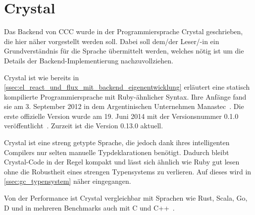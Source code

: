 \section{Crystal}
\label{sec:g_crystal}

Das Backend von CCC wurde in der Programmiersprache Crystal geschrieben, die
hier näher vorgestellt werden soll.  Dabei soll dem/der Leser/-in ein
Grundverständnis für die Sprache übermittelt werden, welches nötig ist um die
Details der Backend-Implementierung nachzuvollziehen.

Crystal ist wie bereits in
\cref{ssec:el_react_und_flux_mit_backend_eigenentwicklung} erläutert eine
statisch kompilierte Programmiersprache mit Ruby-ähnlicher Syntax.  Ihre Anfänge
fand sie am 3. September 2012 in dem Argentinischen Unternehmen
Manastec~\cite{crystalbd}.  Die erste offizielle Version wurde am 19. Juni 2014
mit der Versionsnummer 0.1.0 veröffentlicht~\cite{crystal010}.  Zurzeit ist die
Version 0.13.0 aktuell.

Crystal ist eine streng getypte Sprache, die jedoch dank ihres intelligenten
Compilers nur selten manuelle Typdeklarationen benötigt.  Dadurch bleibt
Crystal-Code in der Regel kompakt und lässt sich ähnlich wie Ruby gut lesen ohne
die Robustheit eines strengen Typensystems zu verlieren.  Auf dieses wird in
\cref{ssec:gc_typensystem} näher eingegangen.

Von der Performance ist Crystal vergleichbar mit Sprachen wie Rust, Scala, Go,
D und in mehreren Benchmarks auch mit C und C++~\cite{benchmarks}.




